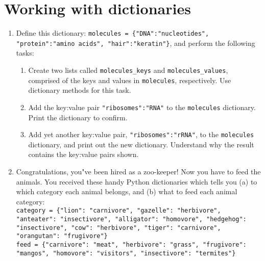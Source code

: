 \documentclass{article}[12pt]
\newcommand{\code}[1]{\texttt{#1}}  %
\begin{document}
\section{Working with dictionaries}

\begin{enumerate}
    \item Define this dictionary: \code{molecules = \{"DNA":"nucleotides", "protein":"amino acids", "hair":"keratin"\}}, and perform the following tasks:
    
    \begin{enumerate}
        \item Create two lists called \code{molecules\_keys} and \code{molecules\_values}, comprised of the keys and values in \code{molecules}, respectively. Use dictionary methods for this task.
        \item Add the key:value pair \code{"ribosomes":"RNA"} to the \code{molecules} dictionary. Print the dictionary to confirm.
        \item Add yet another key:value pair, \code{"ribosomes":"rRNA"}, to the \code{molecules} dictionary, and print out the new dictionary. Understand why the result contains the key:value pairs shown.
    \end{enumerate}
	
\item Congratulations, you"ve been hired as a zoo-keeper! Now you have to feed the animals. You received these handy Python dictionaries which tells you (a) to which category each animal belongs, and (b) what to feed each animal category: \\
	
	\code{category = \{"lion": "carnivore", "gazelle": "herbivore", "anteater": "insectivore", "alligator": "homovore", "hedgehog": "insectivore", "cow": "herbivore", "tiger": "carnivore", "orangutan": "frugivore"\}} \\
	
	\code{feed = \{"carnivore": "meat", "herbivore": "grass", "frugivore": "mangos", "homovore": "visitors", "insectivore": "termites"\} } \\
	

\end{enumerate}
\end{document}

